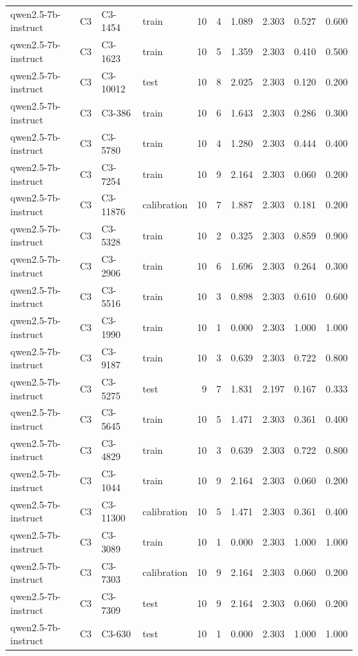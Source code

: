 \begin{table}
\begin{tabular}{llllrrrrrr}
qwen2.5-7b-instruct & C3 & C3-1454 & train & 10 & 4 & 1.089 & 2.303 & 0.527 & 0.600 \\
qwen2.5-7b-instruct & C3 & C3-1623 & train & 10 & 5 & 1.359 & 2.303 & 0.410 & 0.500 \\
qwen2.5-7b-instruct & C3 & C3-10012 & test & 10 & 8 & 2.025 & 2.303 & 0.120 & 0.200 \\
qwen2.5-7b-instruct & C3 & C3-386 & train & 10 & 6 & 1.643 & 2.303 & 0.286 & 0.300 \\
qwen2.5-7b-instruct & C3 & C3-5780 & train & 10 & 4 & 1.280 & 2.303 & 0.444 & 0.400 \\
qwen2.5-7b-instruct & C3 & C3-7254 & train & 10 & 9 & 2.164 & 2.303 & 0.060 & 0.200 \\
qwen2.5-7b-instruct & C3 & C3-11876 & calibration & 10 & 7 & 1.887 & 2.303 & 0.181 & 0.200 \\
qwen2.5-7b-instruct & C3 & C3-5328 & train & 10 & 2 & 0.325 & 2.303 & 0.859 & 0.900 \\
qwen2.5-7b-instruct & C3 & C3-2906 & train & 10 & 6 & 1.696 & 2.303 & 0.264 & 0.300 \\
qwen2.5-7b-instruct & C3 & C3-5516 & train & 10 & 3 & 0.898 & 2.303 & 0.610 & 0.600 \\
qwen2.5-7b-instruct & C3 & C3-1990 & train & 10 & 1 & 0.000 & 2.303 & 1.000 & 1.000 \\
qwen2.5-7b-instruct & C3 & C3-9187 & train & 10 & 3 & 0.639 & 2.303 & 0.722 & 0.800 \\
qwen2.5-7b-instruct & C3 & C3-5275 & test & 9 & 7 & 1.831 & 2.197 & 0.167 & 0.333 \\
qwen2.5-7b-instruct & C3 & C3-5645 & train & 10 & 5 & 1.471 & 2.303 & 0.361 & 0.400 \\
qwen2.5-7b-instruct & C3 & C3-4829 & train & 10 & 3 & 0.639 & 2.303 & 0.722 & 0.800 \\
qwen2.5-7b-instruct & C3 & C3-1044 & train & 10 & 9 & 2.164 & 2.303 & 0.060 & 0.200 \\
qwen2.5-7b-instruct & C3 & C3-11300 & calibration & 10 & 5 & 1.471 & 2.303 & 0.361 & 0.400 \\
qwen2.5-7b-instruct & C3 & C3-3089 & train & 10 & 1 & 0.000 & 2.303 & 1.000 & 1.000 \\
qwen2.5-7b-instruct & C3 & C3-7303 & calibration & 10 & 9 & 2.164 & 2.303 & 0.060 & 0.200 \\
qwen2.5-7b-instruct & C3 & C3-7309 & test & 10 & 9 & 2.164 & 2.303 & 0.060 & 0.200 \\
qwen2.5-7b-instruct & C3 & C3-630 & test & 10 & 1 & 0.000 & 2.303 & 1.000 & 1.000 \\

\end{tabular}
\end{table}
